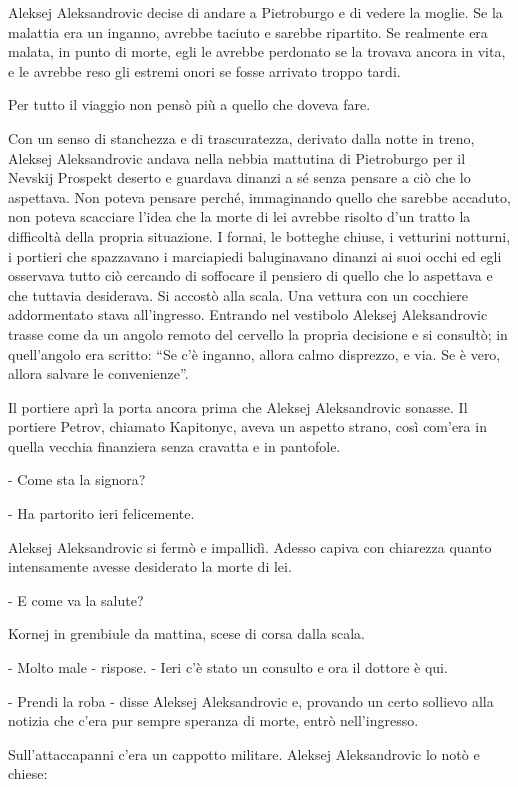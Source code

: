 Aleksej Aleksandrovic decise di andare a Pietroburgo e di vedere la moglie. Se la malattia era un inganno, avrebbe taciuto e sarebbe ripartito. Se realmente era malata, in punto di morte, egli le avrebbe perdonato se la trovava ancora in vita, e le avrebbe reso gli estremi onori se fosse arrivato troppo tardi. 

Per tutto il viaggio non pensò più a quello che doveva fare. 

Con un senso di stanchezza e di trascuratezza, derivato dalla notte in treno, Aleksej Aleksandrovic andava nella nebbia mattutina di Pietroburgo per il Nevskij Prospekt deserto e guardava dinanzi a sé senza pensare a ciò che lo aspettava. Non poteva pensare perché, immaginando quello che sarebbe accaduto, non poteva scacciare l'idea che la morte di lei avrebbe risolto d'un tratto la difficoltà della propria situazione. I fornai, le botteghe chiuse, i vetturini notturni, i portieri che spazzavano i marciapiedi baluginavano dinanzi ai suoi occhi ed egli osservava tutto ciò cercando di soffocare il pensiero di quello che lo aspettava e che tuttavia desiderava. Si accostò alla scala. Una vettura con un cocchiere addormentato stava all'ingresso. Entrando nel vestibolo Aleksej Aleksandrovic trasse come da un angolo remoto del cervello la propria decisione e si consultò; in quell'angolo era scritto: ``Se c'è inganno, allora calmo disprezzo, e via. Se è vero, allora salvare le convenienze''. 

Il portiere aprì la porta ancora prima che Aleksej Aleksandrovic sonasse. Il portiere Petrov, chiamato Kapitonyc, aveva un aspetto strano, così com'era in quella vecchia finanziera senza cravatta e in pantofole. 

- Come sta la signora? 

- Ha partorito ieri felicemente. 

Aleksej Aleksandrovic si fermò e impallidì. Adesso capiva con chiarezza quanto intensamente avesse desiderato la morte di lei. 

- E come va la salute? 

Kornej in grembiule da mattina, scese di corsa dalla scala. 

- Molto male - rispose. - Ieri c'è stato un consulto e ora il dottore è qui. 

- Prendi la roba - disse Aleksej Aleksandrovic e, provando un certo sollievo alla notizia che c'era pur sempre speranza di morte, entrò nell'ingresso. 

Sull'attaccapanni c'era un cappotto militare. Aleksej Aleksandrovic lo notò e chiese: 

